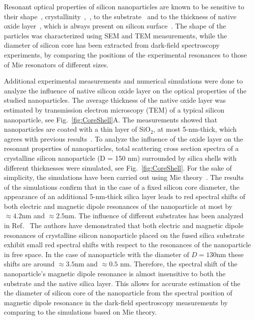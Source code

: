         Resonant optical properties of silicon nanoparticles are known to be sensitive to their shape~\cite{zywietz2015electromagnetic},
        crystallinity~\cite{zywietz2015electromagnetic},~, to the substrate~\cite{miroshnichenko2015substrate} and
        to the thickness of native oxide layer~\cite{zywietz2015electromagnetic, fu2012directional},
        which is always present on silicon surface~\cite{morita1990growth}. The shape of the particles was characterized using
        SEM and TEM measurements, while the diameter of silicon core has been extracted from dark-field spectroscopy experiments, by
        comparing the positions of the experimental resonances to those of Mie resonators of different sizes.

        Additional experimental measurements and numerical simulations were done to analyze the influence of native silicon oxide layer
        on the optical properties of the studied nanoparticles. The average thickness of the native oxide layer was
        estimated by transmission electron microscopy (TEM) of a typical silicon nanoparticle, see Fig.~\ref{fig:CoreShell}A.
        The measurements showed that nanoparticles are coated with a thin layer of SiO$_2$, at most 5-nm-thick, which agrees
        with previous results~\cite{zywietz2015electromagnetic, fu2012directional}.
        To analyze the influence of the oxide layer on the resonant properties of nanoparticles,
        total scattering cross section spectra of a crystalline silicon nanoparticle (D = 150 nm) surrounded by
        silica shells with different thicknesses were simulated, see Fig.~\ref{fig:CoreShell}. For the sake of simplicity, the simulations have been carried out
        using Mie theory~\cite{bohren1983absorption}. The results of the simulations confirm that in the case of a fixed silicon core diameter, the appearance of an additional
        5-nm-thick silica layer leads to red spectral shifts of both electric and magnetic dipole resonances of the
        nanoparticle at most by $≈ 4.2$nm and $≈ 2.5$nm. The influence of different substrates has been analyzed in
        Ref.~\cite{miroshnichenko2015substrate} The authors have demonstrated that both electric and magnetic dipole resonances of
        crystalline silicon nanoparticle
        placed on the fused silica substrate exhibit small red spectral shifts with respect to the resonances of the nanoparticle
        in free space. In the case of nanoparticle with the diameter of $D = 130 $nm these shifts are around $≈ 3.5 $nm and $≈ 0.5$ nm.
        Therefore, the spectral shift of the nanoparticle’s magnetic dipole resonance is almost insensitive to both
        the substrate and the native silica layer. This allows for accurate estimation of the the diameter of silicon core of the nanoparticle
        from the spectral position of magnetic dipole resonance in the dark-field spectroscopy measurements by
        comparing to the simulations based on Mie theory.



